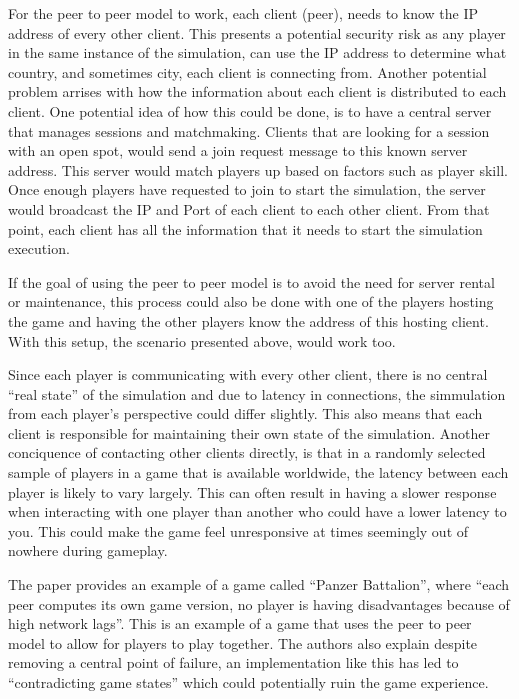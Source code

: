 For the peer to peer model to work, each client (peer), needs to know the IP address of every other client. This presents a potential security risk as any player in the same instance of the simulation, can use the IP address to determine what country, and sometimes city, each client is connecting from. Another potential problem arrises with how the information about each client is distributed to each client. One potential idea of how this could be done, is to have a central server that manages sessions and matchmaking. Clients that are looking for a session with an open spot, would send a join request message to this known server address. This server would match players up based on factors such as player skill. Once enough players have requested to join to start the simulation, the server would broadcast the IP and Port of each client to each other client. From that point, each client has all the information that it needs to start the simulation execution.

If the goal of using the peer to peer model is to avoid the need for server rental or maintenance, this process could also be done with one of the players hosting the game and having the other players know the address of this hosting client. With this setup, the scenario presented above, would work too.

Since each player is communicating with every other client, there is no central ``real state'' of the simulation and due to latency in connections, the simmulation from each player's perspective could differ slightly. This also means that each client is responsible for maintaining their own state of the simulation. Another conciquence of contacting other clients directly, is that in a randomly selected sample of players in a game that is available worldwide, the latency between each player is likely to vary largely. This can often result in having a slower response when interacting with one player than another who could have a lower latency to you. This could make the game feel unresponsive at times seemingly out of nowhere during gameplay.

The paper  provides an example of a game called ``Panzer Battalion'', where ``each peer computes its own game version, no player is having disadvantages because of high network lags''. This is an example of a game that uses the peer to peer model to allow for players to play together. The authors also explain despite removing a central point of failure, an implementation like this has led to ``contradicting game states'' which could potentially ruin the game experience.


